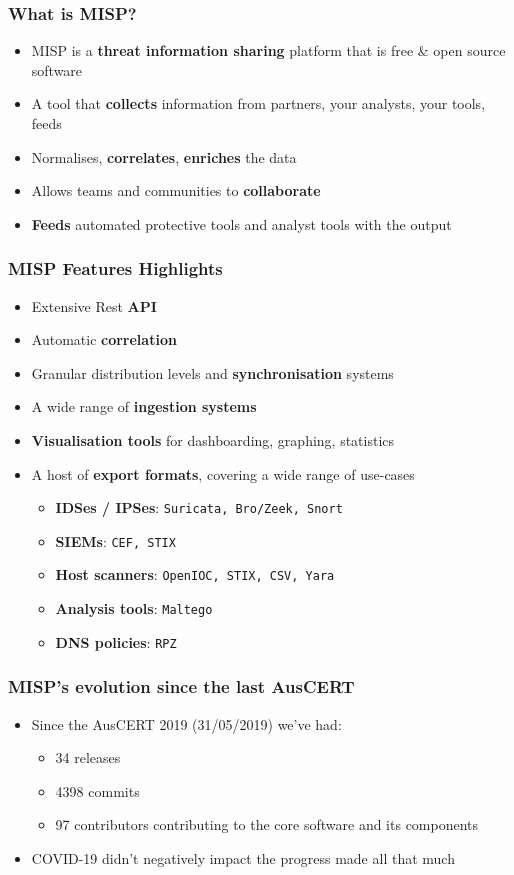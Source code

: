 \begin{frame}
\frametitle{What is MISP?}
\begin{itemize}
       \item MISP is a {\bf threat information sharing} platform that is free \& open source software
       \item A tool that {\bf collects} information from partners, your analysts, your tools, feeds
       \item Normalises, {\bf correlates}, {\bf enriches} the data
       \item Allows teams and communities to {\bf collaborate}
       \item {\bf Feeds} automated protective tools and analyst tools with the output
\end{itemize}
\end{frame}

\begin{frame}
\frametitle{MISP Features Highlights}
    \begin{itemize}
        \item Extensive Rest {\bf API}
        \item Automatic {\bf correlation}
        \item Granular distribution levels and {\bf synchronisation} systems
        \item A wide range of {\bf ingestion systems}
        \item {\bf Visualisation tools} for dashboarding, graphing, statistics
        \item A host of {\bf export formats}, covering a wide range of use-cases
        \begin{itemize}
            \item {\bf IDSes / IPSes}: \texttt{Suricata, Bro/Zeek, Snort}
            \item {\bf SIEMs}: \texttt{CEF, STIX}
            \item {\bf Host scanners}:  \texttt{OpenIOC, STIX, CSV, Yara}
            \item {\bf Analysis tools}: \texttt{Maltego}
            \item {\bf DNS policies}: \texttt{RPZ}
        \end{itemize}
    \end{itemize}
\end{frame}


\begin{frame}
  \frametitle{MISP's evolution since the last AusCERT}
  \begin{itemize}
    \item Since the AusCERT 2019 (31/05/2019) we've had:
    \begin{itemize}
        \item 34 releases
        \item 4398 commits
        \item 97 contributors contributing to the core software and its components
    \end{itemize}
    \item COVID-19 didn't negatively impact the progress made all that much
  \end{itemize}
\end{frame}

